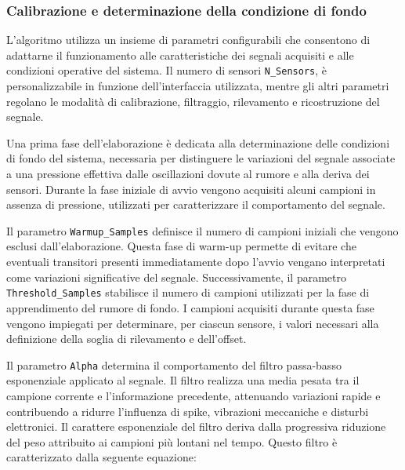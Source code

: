 \documentclass[10pt, a4paper]{article}
\begin{document}
            \subsubsection{Calibrazione e determinazione della condizione di fondo}
                L'algoritmo utilizza un insieme di parametri configurabili che consentono di adattarne il funzionamento alle caratteristiche dei segnali acquisiti e alle condizioni operative
                del sistema. Il numero di sensori \texttt{N\_Sensors}, è personalizzabile in funzione dell'interfaccia utilizzata, mentre gli altri parametri regolano le modalità
                di calibrazione, filtraggio, rilevamento e ricostruzione del segnale.

                Una prima fase dell'elaborazione è dedicata alla determinazione delle condizioni di fondo del sistema, necessaria per distinguere le variazioni del segnale associate a una pressione 
                effettiva dalle oscillazioni dovute al rumore e alla deriva dei sensori.
                Durante la fase iniziale di avvio vengono acquisiti alcuni campioni in assenza di pressione, utilizzati per caratterizzare il comportamento del segnale.
                
                Il parametro \texttt{Warmup\_Samples} definisce il numero di campioni iniziali che vengono esclusi dall'elaborazione. Questa fase di warm-up permette di evitare che eventuali 
                transitori presenti immediatamente dopo l'avvio vengano interpretati come variazioni significative del segnale. Successivamente, il parametro \texttt{Threshold\_Samples} stabilisce il numero 
                di campioni utilizzati per la fase di apprendimento del rumore di fondo. I campioni acquisiti durante questa fase vengono impiegati per determinare, per ciascun sensore, 
                i valori necessari alla definizione della soglia di rilevamento e dell'offset.
                
                Il parametro \texttt{Alpha} determina il comportamento del filtro passa-basso esponenziale applicato al segnale. Il filtro realizza una 
                media pesata tra il campione corrente e l'informazione precedente, attenuando variazioni rapide e contribuendo a ridurre l'influenza di spike, vibrazioni meccaniche e disturbi
                elettronici. Il carattere esponenziale del filtro deriva dalla progressiva riduzione del peso attribuito ai campioni più lontani nel tempo.
                Questo filtro è caratterizzato dalla seguente equazione:
\end{document}
